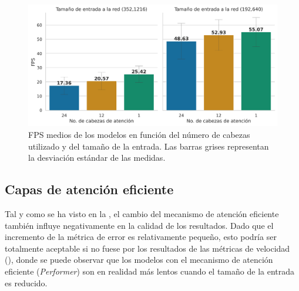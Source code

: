 \begin{figure}[H]
\centering
\includegraphics[width=0.75\linewidth]{imagenes/Resultados/velocidad_inferencia_cabezas_atencion.png} 
\captionsetup{width=.8\linewidth}
\caption{FPS medios de los modelos en función del número de cabezas utilizado y del tamaño de la entrada. Las barras grises representan la desviación estándar de las medidas.}
\label{fig:resultados-inf-num-cabezas}
\end{figure}
























\subsection{Capas de atención eficiente}\label{resultados-cuantitativos-atencion}
Tal y como se ha visto en la , el cambio del mecanismo de atención eficiente también influye negativamente en la calidad de los resultados. Dado que el incremento de la métrica de error es relativamente pequeño, esto podría ser totalmente aceptable si no fuese por los resultados de las métricas de velocidad (), donde se puede observar que los modelos con el mecanismo de atención eficiente (\textit{Performer}) son en realidad más lentos cuando el tamaño de la entrada es reducido.

